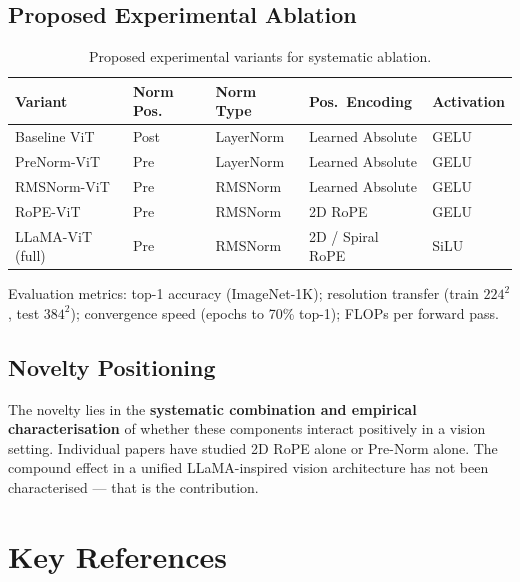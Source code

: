 \documentclass[12pt,a4paper]{article}
\begin{document}
\subsection{Proposed Experimental Ablation}

\begin{table}[H]
\centering
\caption{Proposed experimental variants for systematic ablation.}
\label{tab:ablation}
\renewcommand{\arraystretch}{1.3}
\begin{tabularx}{\linewidth}{l l l l l}
\toprule
\textbf{Variant} & \textbf{Norm Pos.} & \textbf{Norm Type}
  & \textbf{Pos.\ Encoding} & \textbf{Activation} \\
\midrule
Baseline ViT       & Post & LayerNorm & Learned Absolute  & GELU \\
PreNorm-ViT        & Pre  & LayerNorm & Learned Absolute  & GELU \\
RMSNorm-ViT        & Pre  & RMSNorm   & Learned Absolute  & GELU \\
RoPE-ViT           & Pre  & RMSNorm   & 2D RoPE           & GELU \\
LLaMA-ViT (full)   & Pre  & RMSNorm   & 2D / Spiral RoPE  & SiLU \\
\bottomrule
\end{tabularx}
\end{table}

Evaluation metrics: top-1 accuracy (ImageNet-1K); resolution transfer (train
$224^2$, test $384^2$); convergence speed (epochs to 70\% top-1); FLOPs per
forward pass.

\subsection{Novelty Positioning}
The novelty lies in the \textbf{systematic combination and empirical
characterisation} of whether these components interact positively in a vision
setting. Individual papers have studied 2D RoPE alone \cite{rope_vit2024} or
Pre-Norm alone. The compound effect in a unified LLaMA-inspired vision
architecture has not been characterised --- that is the contribution.

\section{Key References}
\label{sec:refs}
\end{document}
